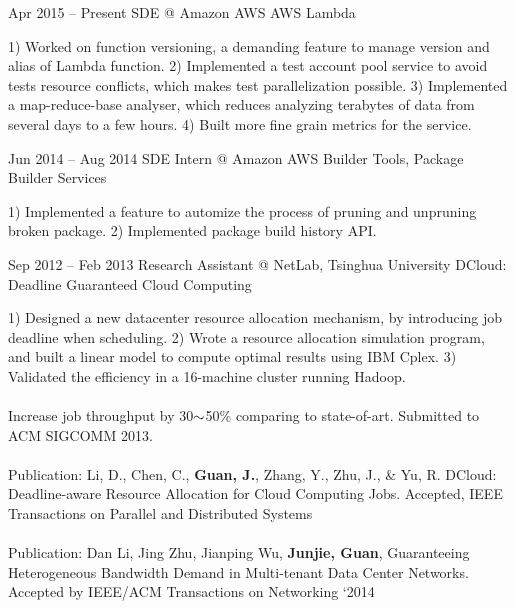 \documentclass{tccv}
\begin{document}
\begin{eventlist}

\item{Apr 2015 -- Present}
     {SDE @ Amazon AWS}
     {AWS Lambda}
     
     1) Worked on function versioning, a demanding feature to manage version and alias of Lambda function.  2) Implemented a test account pool service to avoid tests resource conflicts, which makes test parallelization possible. 3) Implemented a map-reduce-base analyser, which reduces analyzing terabytes of data from several days to a few hours. 4) Built more fine grain metrics for the service.

\item{Jun 2014 -- Aug 2014}
     {SDE Intern @ Amazon AWS}
     {Builder Tools, Package Builder Services}
     
    1) Implemented a feature to automize the process of pruning and unpruning broken package. 2) Implemented package build history API.
     
\item{Sep 2012 -- Feb 2013}
     {Research Assistant @ NetLab, Tsinghua University}
     {DCloud: Deadline Guaranteed Cloud Computing}
     
     1) Designed a new datacenter resource allocation mechanism, by introducing job deadline when scheduling. 2) Wrote a resource allocation simulation program, and built a linear model to compute optimal results using IBM Cplex. 3) Validated the efficiency in a 16-machine cluster running Hadoop.
     \\\\
     Increase job throughput by 30$\scriptsize{\sim}$50\% comparing to state-of-art. Submitted to ACM SIGCOMM 2013.
     \\\\
     Publication: Li, D., Chen, C., \textbf{Guan, J.}, Zhang, Y., Zhu, J., \& Yu, R. DCloud: Deadline-aware Resource Allocation for Cloud Computing Jobs. Accepted, IEEE Transactions on Parallel and Distributed Systems
     \\\\
     Publication: Dan Li, Jing Zhu, Jianping Wu, \textbf{Junjie, Guan}, Guaranteeing Heterogeneous Bandwidth Demand in Multi-tenant Data Center Networks. Accepted by IEEE/ACM Transactions on Networking ‘2014

     
     
     
     
     
     
    
    

\end{eventlist}
\end{document}
